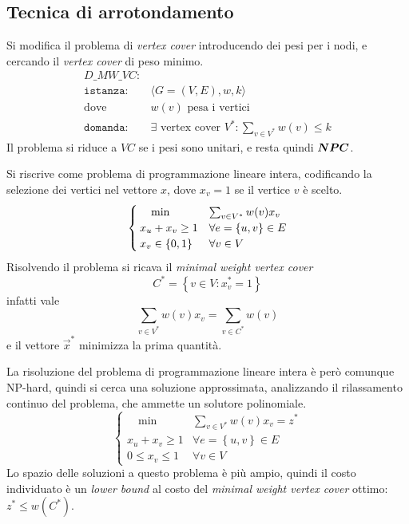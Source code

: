 \subsection{Tecnica di arrotondamento}

Si modifica il problema di \emph{vertex cover} introducendo dei pesi per i nodi, e cercando il \emph{vertex cover} di peso minimo.
\begin{align*}
    D\_MW\_VC: & \\
    \texttt{istanza:} \quad & \langle G=(V,E), w, k \rangle \\
    \text{dove} \quad &
    w(v) \text{ pesa i vertici}
    \\
    \texttt{domanda:} \quad &
    \exists \text{ vertex cover } V^* :
    \sum_{v \in V^*} w(v) \leq k
\end{align*}
Il problema si riduce a $VC$ se i pesi sono unitari, e resta quindi $\bm{NPC}$.

Si riscrive come problema di programmazione lineare intera, codificando la selezione dei vertici nel vettore $x$, dove $x_v=1$ se il vertice $v$ è scelto.
\begin{equation*}
    \begin{cases}
        \quad
        \min
        &
        \sum_{v \in V^*} w(v) x_v
        \\
        x_u + x_v \geq 1
        &
        \forall e = \left\{ u,v \right\} \in E
        \\
        x_v \in \left\{0,1\right\}^{}
        &
        \forall v \in V
    \end{cases}
\end{equation*}
Risolvendo il problema si ricava il \emph{minimal weight vertex cover}
\begin{equation*}
    C^* = \left\{ 
        v \in V : x_v^* = 1
    \right\}
\end{equation*}
infatti vale
\begin{equation*}
    \sum_{v \in V^*} w(v) x_v
    =
    \sum_{v \in C^*} w(v)
\end{equation*}
e il vettore $\vec{x}^*$ minimizza la prima quantità.

La risoluzione del problema di programmazione lineare intera è però comunque NP-hard, quindi si cerca una soluzione approssimata, analizzando il rilassamento continuo del problema, che ammette un solutore polinomiale.
\begin{equation*}
    \begin{cases}
        \quad
        \min 
        &
        \sum_{v \in V^*} w(v) x_v = z^*
        \\
        x_u + x_v \geq 1
        &
        \forall e = \left\{ u,v \right\} \in E
        \\
        0 \leq x_v \leq 1
        &
        \forall v \in V
    \end{cases}
\end{equation*}
Lo spazio delle soluzioni a questo problema è più ampio, quindi il costo individuato è un \emph{lower bound} al costo del \emph{minimal weight vertex cover} ottimo: $z^* \leq w(C^*)$.

